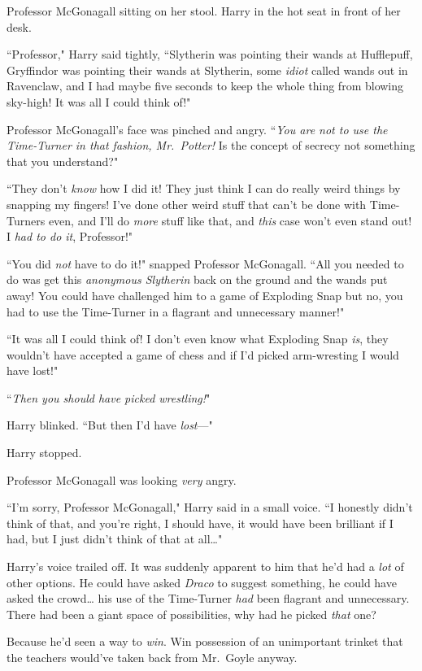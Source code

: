 Professor McGonagall sitting on her stool. Harry in the hot seat in front of her desk.

``Professor," Harry said tightly, ``Slytherin was pointing their wands at Hufflepuff, Gryffindor was pointing their wands at Slytherin, some \emph{idiot} called wands out in Ravenclaw, and I had maybe five seconds to keep the whole thing from blowing sky-high! It was all I could think of!"

Professor McGonagall's face was pinched and angry. ``\emph{You are not to use the Time-Turner in that fashion, Mr.~Potter!} Is the concept of secrecy not something that you understand?"

``They don't \emph{know} how I did it! They just think I can do really weird things by snapping my fingers! I've done other weird stuff that can't be done with Time-Turners even, and I'll do \emph{more} stuff like that, and \emph{this} case won't even stand out! I \emph{had to do it}, Professor!"

``You did \emph{not} have to do it!" snapped Professor McGonagall. ``All you needed to do was get this \emph{anonymous Slytherin} back on the ground and the wands put away! You could have challenged him to a game of Exploding Snap but no, you had to use the Time-Turner in a flagrant and unnecessary manner!"

``It was all I could think of! I don't even know what Exploding Snap \emph{is}, they wouldn't have accepted a game of chess and if I'd picked arm-wresting I would have lost!"

``\emph{Then you should have picked wrestling!}"

Harry blinked. ``But then I'd have \emph{lost}—"

Harry stopped.

Professor McGonagall was looking \emph{very} angry.

``I'm sorry, Professor McGonagall," Harry said in a small voice. ``I honestly didn't think of that, and you're right, I should have, it would have been brilliant if I had, but I just didn't think of that at all{\ldots}"

Harry's voice trailed off. It was suddenly apparent to him that he'd had a \emph{lot} of other options. He could have asked \emph{Draco} to suggest something, he could have asked the crowd{\ldots} his use of the Time-Turner \emph{had} been flagrant and unnecessary. There had been a giant space of possibilities, why had he picked \emph{that} one?

Because he'd seen a way to \emph{win}. Win possession of an unimportant trinket that the teachers would've taken back from Mr.~Goyle anyway.

